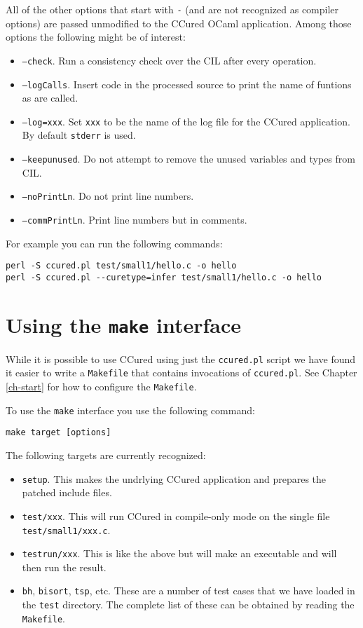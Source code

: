 \documentclass{book}
\def\t#1{{\tt #1}}
\begin{document}
 All of the other options that start with \t{-} (and are not recognized as
compiler options) are passed unmodified to the CCured OCaml application. Among
those options the following might be of interest:
\begin{itemize}
\item \t{--check}. Run a consistency check over the CIL after every operation. 
\item \t{--logCalls}. Insert code in the processed source to print the name of
funtions as are called. 
\item \t{--log=xxx}. Set \t{xxx} to be the name of the log file for the CCured
application. By default \t{stderr} is used.
\item \t{--keepunused}. Do not attempt to remove the unused variables and
types from CIL. 
\item \t{--noPrintLn}. Do not print line numbers.
\item \t{--commPrintLn}. Print line numbers but in comments.
\end{itemize}

 For example you can run the following commands:
\begin{verbatim}
perl -S ccured.pl test/small1/hello.c -o hello
perl -S ccured.pl --curetype=infer test/small1/hello.c -o hello
\end{verbatim}

 \section{Using the {\tt make} interface}

 While it is possible to use CCured using just the \t{ccured.pl} script we
have found it easier to write a \t{Makefile} that contains invocations of
\t{ccured.pl}. See Chapter \ref{ch-start} for how to configure the
\t{Makefile}. 
 
 To use the \t{make} interface you use the following command:
\begin{verbatim}
make target [options]
\end{verbatim}

 The following targets are currently recognized:
\begin{itemize}
\item \t{setup}. This makes the undrlying CCured application and prepares the
patched include files.
\item \t{test/xxx}.  This will run CCured in compile-only mode on the single
file \t{test/small1/xxx.c}. 
\item \t{testrun/xxx}. This is like the above but will make an executable and
will then run the result. 
\item \t{bh}, \t{bisort}, \t{tsp}, etc. These are a number of test cases that
we have loaded in the \t{test} directory. The complete list of these can be
obtained by reading the \t{Makefile}.
\end{itemize}
\end{document}
